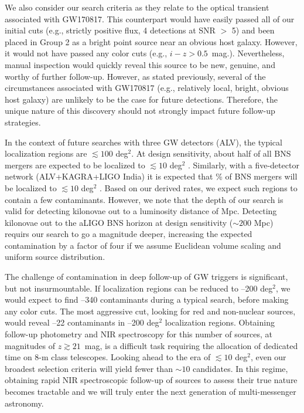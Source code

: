 We also consider our search criteria as they relate to the optical transient associated with GW170817. This counterpart would have easily passed all of our initial cuts (e.g., strictly positive flux, 4 detections at SNR $>$ 5) and been placed in Group 2 as a bright point source near an obvious host galaxy. However, it would not have passed any color cuts (e.g., $i-z > 0.5$~mag.). Nevertheless, manual inspection would quickly reveal this source to be new, genuine, and worthy of further follow-up. However, as stated previously, several of the circumstances associated with GW170817 (e.g., relatively local, bright, obvious host galaxy) are unlikely to be the case for future detections. Therefore, the unique nature of this discovery should not strongly impact future follow-up strategies.

In the context of future searches with three GW detectors (ALV), the typical localization regions are $\lesssim 100$ deg$^2$. At design sensitivity, about half of all BNS mergers are expected to be localized to $\lesssim10$ deg$^2$ \citep{ChenHolz16}. Similarly, with a five-detector network (ALV+KAGRA+LIGO India) it is expected that \% of BNS mergers will be localized to $\lesssim 10$ deg$^2$ \citep{ChenHolz16}. Based on our derived rates, we expect such regions to contain a few contaminants. However, we note that the depth of our search is valid for detecting kilonovae out to a luminosity distance of  Mpc. Detecting kilonovae out to the aLIGO BNS horizon at design sensitivity ($\sim200$ Mpc) requirs our search to go a magnitude deeper, increasing the expected contamination by a factor of four if we assume Euclidean volume scaling and uniform source distribution.

The challenge of contamination in deep follow-up of GW triggers is significant, but not insurmountable. If localization regions can be reduced to --200 deg$^2$, we would expect to find --340 contaminants during a typical search, before making any color cuts. The most aggressive cut, looking for red and non-nuclear sources, would reveal --22 contaminants in --200 deg$^2$ localization regions. Obtaining follow-up photometry and NIR spectroscopy for this number of sources, at magnitudes of $z \gtrsim 21$~mag, is a difficult task requiring the allocation of dedicated time on 8-m class telescopes. Looking ahead to the era of $\lesssim 10$ deg$^2$, even our broadest selection criteria will yield fewer than $\sim 10$ candidates. In this regime, obtaining rapid NIR spectroscopic follow-up of sources to assess their true nature becomes tractable and we will truly enter the next generation of multi-messenger astronomy.

